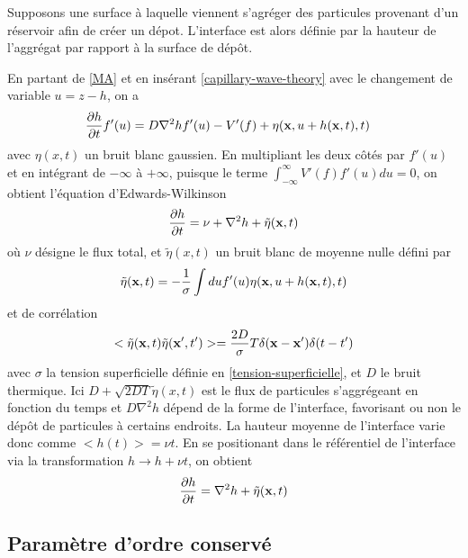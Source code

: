 Supposons une surface à laquelle viennent s'agréger des particules provenant d'un réservoir afin de créer un dépot. L'interface est alors définie par la hauteur de l'aggrégat par rapport à la surface de dépôt.

En partant de \ref{MA} et en insérant \ref{capillary-wave-theory} avec le changement de variable $u= z-h$, on a \cite{bray_interface_2001}
\begin{align}
    \frac{\partial h}{\partial t} f'(u) &= D \nabla^2 h f'(u) - V'(f) + \eta({\bf x},u+h({\bf x},t),t)
\end{align}
avec $\eta(x,t)$ un bruit blanc gaussien. En multipliant les deux côtés par $f'(u)$ et en intégrant de $-\infty$ à $+\infty$, puisque le terme $ \int_{-\infty}^\infty V'(f) f'(u) du = 0$, on obtient l'équation d'Edwards-Wilkinson \cite{edwards_surface_1982} 
\begin{align}
     \frac{\partial h}{\partial t} = \nu + \nabla^2 h +  \tilde{\eta}({\bf x},t)
    \label{edwards-wilkinson}
\end{align}
où $\nu$ désigne le flux total, et $\tilde{\eta}(x,t)$  un bruit blanc de moyenne nulle défini par
\begin{align}
    \tilde{\eta}({\bf x},t) = - \frac{1}{\sigma} \int du f'(u) \eta({\bf x},u+h({\bf x},t),t)
\end{align}
et de corrélation 
\begin{align}
    <\tilde{\eta}({\bf x},t)\tilde{\eta}({\bf x}',t')> = \frac{2 D}{\sigma} T\delta({\bf x}-{\bf x}')\delta(t-t')
\end{align}
avec $\sigma$ la tension superficielle définie en \ref{tension-superficielle}, et $D$ le bruit thermique.
Ici $D+ \sqrt{2 D T} \tilde{\eta}(x,t)$ est le flux de particules s'aggrégeant en fonction du temps et $D \nabla^2 h$ dépend de la forme de l'interface, favorisant ou non le dépôt de particules à certains endroits.
La hauteur moyenne de l'interface varie donc comme $<h(t)> = \nu t$. En se positionant dans le référentiel de l'interface via la transformation $h \rightarrow h + \nu t$, on obtient
\begin{align}
     \frac{\partial h}{\partial t} =    \nabla^2 h +  \tilde{\eta}({\bf x},t)
    \label{edwards-wilkinson-conesrved}
\end{align}

    \subsection{Paramètre d'ordre conservé}


